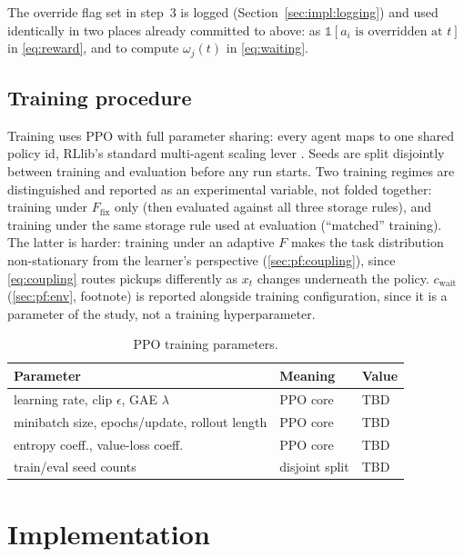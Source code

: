 \documentclass[../main.tex]{subfiles}
\begin{document}
The override flag set in step~3 is logged (Section~\ref{sec:impl:logging})
and used identically in two places already committed to above: as
$\mathbb{1}[a_i\text{ is overridden at }t]$ in \eqref{eq:reward}, and to
compute $\omega_j(t)$ in \eqref{eq:waiting}.

\subsection{Training procedure}
\label{sec:method:training}

Training uses PPO \citep{schulman2017ppo} with full parameter sharing: every
agent maps to one shared policy id, RLlib's standard multi-agent scaling
lever \citep{rllibmultiagent}. Seeds are split disjointly between training
and evaluation before any run starts. Two training regimes are distinguished
and reported as an experimental variable, not folded together: training under
$F_{\mathrm{fix}}$ only (then evaluated against all three storage rules), and
training under the same storage rule used at evaluation (``matched''
training). The latter is harder: training under an adaptive $F$ makes the
task distribution non-stationary from the learner's perspective
(\ref{sec:pf:coupling}), since \eqref{eq:coupling} routes pickups differently
as $x_t$ changes underneath the policy. $c_{\mathrm{wait}}$
(\ref{sec:pf:env}, footnote) is reported alongside training configuration,
since it is a parameter of the study, not a training hyperparameter.

\begin{table}[h]
  \centering
  \caption{PPO training parameters.}
  \label{tab:trainparams}
  \begin{tabular}{lll}
    \toprule
    Parameter & Meaning & Value \\
    \midrule
    learning rate, clip $\epsilon$, GAE $\lambda$ & PPO core & TBD \\
    minibatch size, epochs/update, rollout length & PPO core & TBD \\
    entropy coeff., value-loss coeff. & PPO core & TBD \\
    train/eval seed counts & disjoint split & TBD \\
    \bottomrule
  \end{tabular}
\end{table}

\section{Implementation}
\label{sec:implementation}
\end{document}
